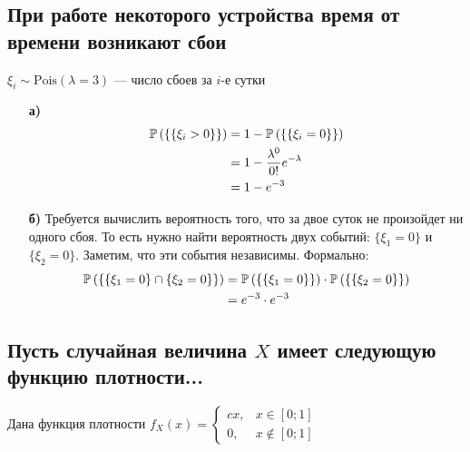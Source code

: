 \documentclass{article}
\begin{document}
\subsection{При работе некоторого устройства время от времени возникают сбои}
$\xi_i\sim\text{Pois}(\lambda=3)$ — число сбоев за $i$-е сутки
\begin{enumerate}
    \item[\textbf{а)}] \begin{equation*}
        \begin{aligned}
            \mathbb{P}\left(\{\{\xi_i>0\}\}\right)&=1-\mathbb{P}\left(\{\{\xi_i=0\}\}\right)\\
            &=1-\frac{\lambda^0}{0!}e^{-\lambda}\\
            &=1-e^{-3}
        \end{aligned}
    \end{equation*}
    \item[\textbf{б)}] Требуется вычислить вероятность того, что за двое суток не произойдет ни одного сбоя. То есть нужно найти вероятность двух событий: $\{\xi_1=0\}$ и $\{\xi_2=0\}$. Заметим, что эти события независимы. Формально:
    \begin{equation*}
        \begin{aligned}
            \mathbb{P}\left(\{\{\xi_1=0\}\cap\{\xi_2=0\}\}\right)&=\mathbb{P}\left(\{\{\xi_1=0\}\}\right)\cdot\mathbb{P}\left(\{\{\xi_2=0\}\}\right)\\
            &=e^{-3}\cdot e^{-3}
        \end{aligned}
    \end{equation*}
\end{enumerate}


\subsection{Пусть случайная величина $X$ имеет следующую функцию плотности...}
Дана функция плотности $f_{X}(x)=\begin{cases}
    cx,&x\in[0;1]\\
    0,&x\not\in[0;1]
\end{cases}$
\end{document}
